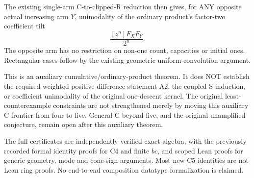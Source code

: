 The existing single-arm C-to-clipped-R reduction then gives, for ANY
opposite actual increasing arm $Y$, unimodality of the ordinary product's
factor-two coefficient tilt
\[
                         \frac{[z^n]F_XF_Y}{2^n}.
\]
The opposite arm has no restriction on non-one count, capacities or
initial ones. Rectangular cases follow by the existing geometric
uniform-convolution argument.

This is an auxiliary cumulative/ordinary-product theorem. It does NOT
establish the required weighted positive-difference statement A2, the
coupled S induction, or coefficient unimodality of the original
one-descent kernel. The original least-counterexample constraints are
not strengthened merely by moving this auxiliary C frontier from four
to five. General C beyond five, and the original unamplified conjecture,
remain open after this auxiliary theorem.

The full certificates are independently verified exact algebra,
with the previously recorded formal identity proofs for C4 and
finite $bc$, and scoped Lean proofs for generic geometry, mode and
cone-sign arguments. Most new C5 identities are not Lean ring proofs.
No end-to-end composition datatype formalization is claimed.

